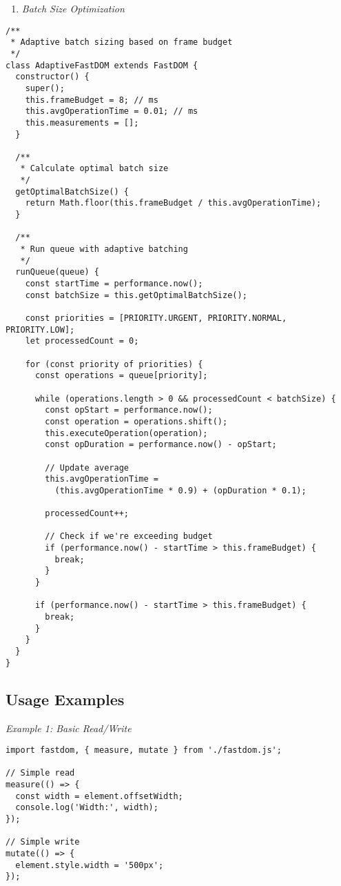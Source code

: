\documentclass[11pt]{article}
\begin{document}
\begin{enumerate}
\item \emph{Batch Size Optimization}
\end{enumerate}
\begin{verbatim}
/**
 * Adaptive batch sizing based on frame budget
 */
class AdaptiveFastDOM extends FastDOM {
  constructor() {
    super();
    this.frameBudget = 8; // ms
    this.avgOperationTime = 0.01; // ms
    this.measurements = [];
  }
  
  /**
   * Calculate optimal batch size
   */
  getOptimalBatchSize() {
    return Math.floor(this.frameBudget / this.avgOperationTime);
  }
  
  /**
   * Run queue with adaptive batching
   */
  runQueue(queue) {
    const startTime = performance.now();
    const batchSize = this.getOptimalBatchSize();
    
    const priorities = [PRIORITY.URGENT, PRIORITY.NORMAL, PRIORITY.LOW];
    let processedCount = 0;
    
    for (const priority of priorities) {
      const operations = queue[priority];
      
      while (operations.length > 0 && processedCount < batchSize) {
        const opStart = performance.now();
        const operation = operations.shift();
        this.executeOperation(operation);
        const opDuration = performance.now() - opStart;
        
        // Update average
        this.avgOperationTime = 
          (this.avgOperationTime * 0.9) + (opDuration * 0.1);
        
        processedCount++;
        
        // Check if we're exceeding budget
        if (performance.now() - startTime > this.frameBudget) {
          break;
        }
      }
      
      if (performance.now() - startTime > this.frameBudget) {
        break;
      }
    }
  }
}
\end{verbatim}
\subsection{Usage Examples}
\label{sec:orga9ced69}

\emph{Example 1: Basic Read/Write}

\begin{verbatim}
import fastdom, { measure, mutate } from './fastdom.js';

// Simple read
measure(() => {
  const width = element.offsetWidth;
  console.log('Width:', width);
});

// Simple write
mutate(() => {
  element.style.width = '500px';
});
\end{verbatim}
\end{document}

